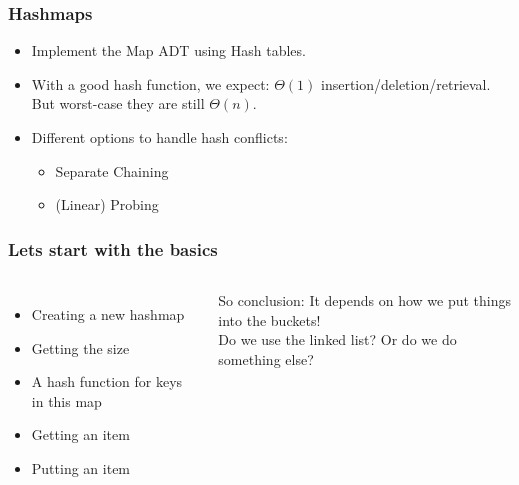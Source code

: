 \begin{frame}
	\frametitle{Hashmaps}
			\begin{itemize}
			\item Implement the Map ADT using Hash tables.
			\item With a good hash function, we expect: $\Theta(1)$ insertion/deletion/retrieval.
			But worst-case they are still $\Theta(n)$.
			\item Different options to handle hash conflicts:
			\begin{itemize}
				\item Separate Chaining
				\item (Linear) Probing
			\end{itemize}
		\end{itemize}
\end{frame}

\begin{frame}
	\frametitle{Lets start with the basics}
	\begin{columns}[T]
		\begin{itemize}
			\item Creating a new hashmap
			\item Getting the size
			\item A hash function for keys in this map
			\item Getting an item
			\item Putting an item
		\end{itemize}
		So conclusion: It depends on how we put things into the buckets!\\
				Do we use the linked list? Or do we do something else?
		
	\end{columns}
\end{frame}


